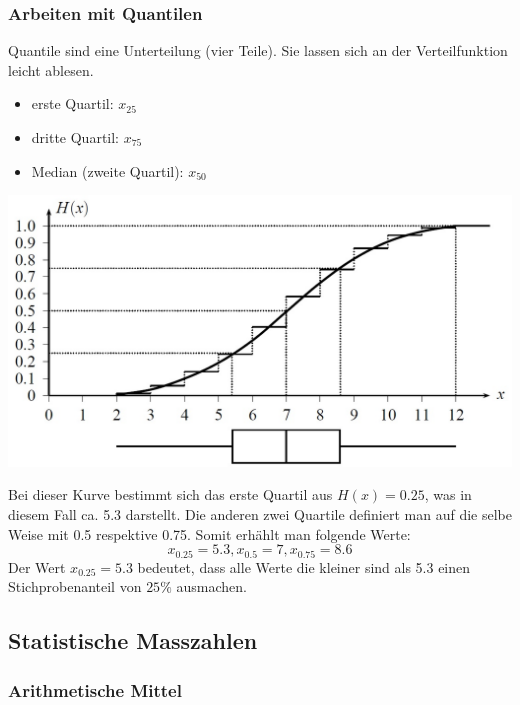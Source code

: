 \documentclass[12pt,a4paper]{article} %
\begin{document}
\subsubsection{Arbeiten mit Quantilen}
Quantile sind eine Unterteilung (vier Teile). Sie lassen sich an der Verteilfunktion leicht ablesen.\\
\begin{itemize}
\item erste Quartil: $x_{25}$
\item dritte Quartil: $x_{75}$
\item Median (zweite Quartil): $x_{50}$
\end{itemize}
\begin{center}
\includegraphics[scale=0.5]{quartile.jpg}
\end{center}

Bei dieser Kurve bestimmt sich das erste Quartil aus $H(x) = 0.25$, was in diesem Fall ca. 5.3 darstellt. Die anderen zwei Quartile definiert man auf die selbe Weise mit 0.5 respektive 0.75. Somit erhählt man folgende Werte:
$$x_{0.25} = 5.3, x_{0.5} = 7, x_{0.75} = 8.6$$
Der Wert $x_{0.25} = 5.3$ bedeutet, dass alle Werte die kleiner sind als 5.3 einen Stichprobenanteil von $25\%$ ausmachen.

\subsection{Statistische Masszahlen}
\subsubsection{Arithmetische Mittel}
\end{document}
